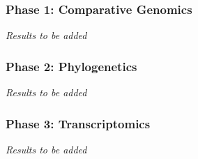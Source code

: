 \subsubsection{Phase 1: Comparative Genomics}

\textit{Results to be added}

\subsubsection{Phase 2: Phylogenetics}

\textit{Results to be added}

\subsubsection{Phase 3: Transcriptomics}

\textit{Results to be added}

